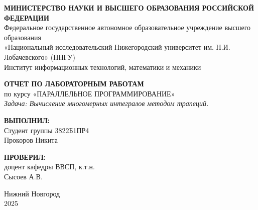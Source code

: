 \documentclass[14pt,a4paper]{extarticle}
\begin{document}
\begin{titlepage}
\begin{center}

\onehalfspacing

\begin{center}
    \textbf{МИНИСТЕРСТВО НАУКИ И ВЫСШЕГО ОБРАЗОВАНИЯ РОССИЙСКОЙ ФЕДЕРАЦИИ} \\
    Федеральное государственное автономное образовательное учреждение высшего образования \\
    «Национальный исследовательский Нижегородский университет им. Н.И. Лобачевского» (ННГУ) \\
    Институт информационных технологий, математики и механики
\end{center}

\vspace{4cm}

\begin{center}
    \textbf{ОТЧЕТ ПО ЛАБОРАТОРНЫМ РАБОТАМ} \vspace{0.5cm}\\
    по курсу «ПАРАЛЛЕЛЬНОЕ ПРОГРАММИРОВАНИЕ» \vspace{0.5cm}\\
    \textit{Задача: Вычисление многомерных интегралов методом трапеций.}
\end{center}

\vspace{4cm}

\begin{flushright}
    \textbf{ВЫПОЛНИЛ:} \\ 
    Студент группы 3822Б1ПР4 \\ 
    Прокоров Никита \\

    \vspace{1cm}

    \textbf{ПРОВЕРИЛ:} \\ 
    доцент кафедры ВВСП, к.т.н. \\ 
    Сысоев А.В.
\end{flushright}

\begin{center}
    Нижний Новгород\\
    2025
\end{center}

\end{center}
\end{titlepage}

\tableofcontents
\newpage
\end{document}
